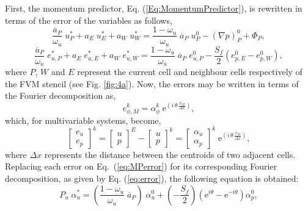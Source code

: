 \documentclass[final,3p,times,11pt,onecolumn]{myElsarticle}
\numberwithin{equation}{section}
\begin{document}
First, the momentum predictor, Eq. (\ref{Eq:MomentumPredictor}), is rewritten in terms of the error of the variables as follows,
\begin{equation}
    \dfrac{\overline{a}_P}{\omega_u} \; u_P^* + a_E \; u_E^* + a_W \; u_W^* = \dfrac{1-\omega_u}{\omega_u} \; \overline{a}_P \; u_P^0 - (\nabla p)^0_P + \Phi_P,
\end{equation}
\begin{equation}
    \dfrac{\overline{a}_P}{\omega_u} \; e_{u,P}^* + a_E \; e_{u,E}^* + a_W \; e_{u,W}^* = \dfrac{1-\omega_u}{\omega_u} \; \overline{a}_P \; e_{u,P}^0 - \dfrac{S_f}{2} (e^0_{p,E}-e^0_{p,W}),
    \label{eq:MPerror}
\end{equation}
where $P$, $W$ and $E$ represent the current cell and neighbour cells respectively of the FVM stencil (see Fig. \ref{fig:4a}).
Now, the errors may be written in terms of the Fourier decomposition as,
\begin{equation}
    e^k_{\phi,M} = \alpha^k_{\phi} \; \text{e}^{\left( i \, \theta \, \frac{x_M}{\Delta x}\right)},
    \label{eq:error}
\end{equation}
which, for multivariable systems, become,
\begin{equation}
\begin{bmatrix}
e_u \\
e_p 
\end{bmatrix}^{k}
=
\begin{bmatrix}
u \\
p 
\end{bmatrix}^{E}
-\begin{bmatrix}
u \\
p 
\end{bmatrix}^{k}
=
\begin{bmatrix}
\alpha_u \\
\alpha_p 
\end{bmatrix}^{k}
\; \text{e}^{\left( i \, \theta \, \frac{x_M}{\Delta x}\right)},
\label{eq:fou1}
\end{equation}
where $\Delta x$ represents the distance between the centroids of two adjacent cells.
Replacing each error on Eq.~(\ref{eq:MPerror}) for its corresponding Fourier decomposition, as given by Eq. (\ref{eq:error}), the following equation is obtained:
\begin{equation}
    P_u \; \alpha_u^* = \left( \dfrac{1-\omega_u}{\omega_u} \; \overline{a}_P \right) \; \alpha_u^0 + \left(- \dfrac{S_f}{2} \right) \left(\text{e}^{i \theta} -  \text{e}^{-i \theta} \right) \alpha_p^0,
    \label{eq:MPfou}
\end{equation}
\end{document}
